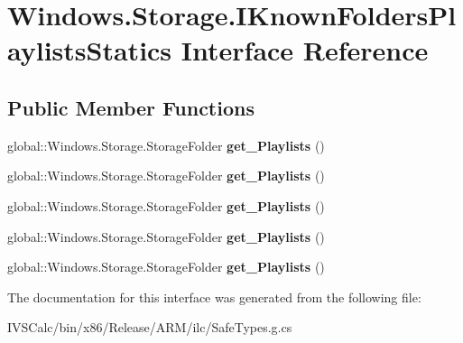 \hypertarget{interface_windows_1_1_storage_1_1_i_known_folders_playlists_statics}{}\section{Windows.\+Storage.\+I\+Known\+Folders\+Playlists\+Statics Interface Reference}
\label{interface_windows_1_1_storage_1_1_i_known_folders_playlists_statics}
\subsection*{Public Member Functions}
\begin{DoxyCompactItemize}
\item 
\mbox{\label{interface_windows_1_1_storage_1_1_i_known_folders_playlists_statics_a0473a4a6fea4d5fa09bba34084fcaca0}} 
global\+::\+Windows.\+Storage.\+Storage\+Folder {\bfseries get\+\_\+\+Playlists} ()
\item 
\mbox{\label{interface_windows_1_1_storage_1_1_i_known_folders_playlists_statics_a0473a4a6fea4d5fa09bba34084fcaca0}} 
global\+::\+Windows.\+Storage.\+Storage\+Folder {\bfseries get\+\_\+\+Playlists} ()
\item 
\mbox{\label{interface_windows_1_1_storage_1_1_i_known_folders_playlists_statics_a0473a4a6fea4d5fa09bba34084fcaca0}} 
global\+::\+Windows.\+Storage.\+Storage\+Folder {\bfseries get\+\_\+\+Playlists} ()
\item 
\mbox{\label{interface_windows_1_1_storage_1_1_i_known_folders_playlists_statics_a0473a4a6fea4d5fa09bba34084fcaca0}} 
global\+::\+Windows.\+Storage.\+Storage\+Folder {\bfseries get\+\_\+\+Playlists} ()
\item 
\mbox{\label{interface_windows_1_1_storage_1_1_i_known_folders_playlists_statics_a0473a4a6fea4d5fa09bba34084fcaca0}} 
global\+::\+Windows.\+Storage.\+Storage\+Folder {\bfseries get\+\_\+\+Playlists} ()
\end{DoxyCompactItemize}


The documentation for this interface was generated from the following file\+:\begin{DoxyCompactItemize}
\item 
I\+V\+S\+Calc/bin/x86/\+Release/\+A\+R\+M/ilc/Safe\+Types.\+g.\+cs\end{DoxyCompactItemize}
